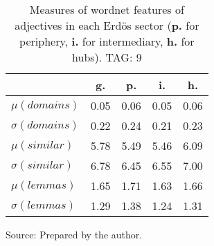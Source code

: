 \begin{table}[h!]
\begin{center}
	\caption{Measures of wordnet features of adjectives in each Erd\"os sector ({{\bf p.}} for periphery, {{\bf i.}} for intermediary, {{\bf h.}} for hubs). TAG: 9}\label{tab:wnas}
\begin{tabular}{| l || c | c | c | c |}\hline
 & {\bf g.} & {\bf p.} & {\bf i.} & {\bf h.} \\\hline\hline
$\mu(domains)$ & 0.05  & 0.06  & 0.05  & 0.06 \\
$\sigma(domains)$ & 0.22  & 0.24  & 0.21  & 0.23 \\\hline
$\mu(similar)$ & 5.78  & 5.49  & 5.46  & 6.09 \\
$\sigma(similar)$ & 6.78  & 6.45  & 6.55  & 7.00 \\\hline
$\mu(lemmas)$ & 1.65  & 1.71  & 1.63  & 1.66 \\
$\sigma(lemmas)$ & 1.29  & 1.38  & 1.24  & 1.31 \\\hline
\end{tabular}
\begin{flushleft}
		Source: Prepared by the author.\
\end{flushleft}
\end{center}
\end{table}
